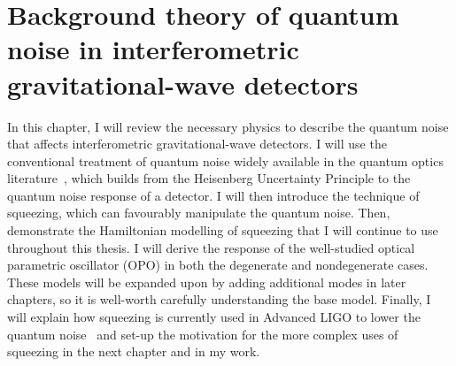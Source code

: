 \chapter{Background theory of quantum noise in interferometric gravitational-wave detectors} %
\label{chp:background_theory}





In this chapter, I will review the necessary physics to describe the quantum noise that affects interferometric gravitational-wave detectors. I will use the conventional treatment of quantum noise widely available in the quantum optics literature~\cite{Danilishin,MiaoQCRB}, which builds from the Heisenberg Uncertainty Principle to the quantum noise response of a detector. 
I will then introduce the technique of squeezing, which can favourably manipulate the quantum noise. Then, demonstrate the Hamiltonian modelling of squeezing that I will continue to use throughout this thesis. I will derive the response of the well-studied optical parametric oscillator (OPO) in both the degenerate and nondegenerate cases. These models will be expanded upon by adding additional modes in later chapters, so it is well-worth carefully understanding the base model. Finally, I will explain how squeezing is currently used in Advanced LIGO to lower the quantum noise~\cite{} and set-up the motivation for the more complex uses of squeezing in the next chapter and in my work.


